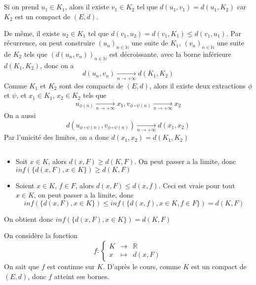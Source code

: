 \documentclass[a4paper,12pt]{book}
\begin{document}
\subsection{}
Si on prend $u_1 \in K_1$, alors il existe $v_1 \in K_2$ tel que $d(u_1,v_1)=d(u_1,K_2)$ car $K_2$ est un compact de  $(E,d)$. 

De même, il existe $u_2\in K_1$ tel que $d(v_1,u_2)=d(v_1,K_1) \leq d(v_1,u_1)$. Par récurrence, on peut construire $(u_n)_{n \in \mathbb{N}}$ une suite de $K_1$, 
$(v_n)_{n \in \mathbb{N}}$ une suite de $K_2$ tels que $(d(u_n,v_n))_{n \in \mathbb{N}}$ est décroissante, avec la borne inférieure $d(K_1,K_2)$, donc on a 
$$
d(u_n,v_n)\xrightarrow[n \to +\infty]{}d(K_1,K_2)
$$ 
Comme $K_1$ et $K_2$ sont des compacts de $(E,d)$, alors il existe deux extractions $\phi$ et $\psi$, et $x_1 \in K_1$, $x_2 \in K_2$ tels que
 $$
 u_{\phi(n)} \xrightarrow[n \to +\infty]{}x_1, v_{\phi \circ \psi(n)} \xrightarrow[n \to +\infty]{}x_2
 $$
On a aussi 
$$
d(u_{\phi \circ \psi(n)},v_{\phi \circ \psi(n)} ) \xrightarrow[n \to +\infty]{} d(x_1,x_2)
$$
Par l'unicité des limites, on a donc $\boxed{d(x_1,x_2)=d(K_1,K_2)}$
\subsection{}
\begin{itemize}
    \item Soit $x \in K$, alors $d(x,F)\geq d(K,F)$. On peut passer a la limite, donc $inf(\{d(x,F),x \in K\}) \geq d(K,F)$
    \item Soient $x \in K$, $f \in F$, alors $d(x,F) \leq d(x,f)$. Ceci est vraie pour tout $x \in K$, on peut passer a la limite, donc 
    $$
    inf(\{d(x,F),x \in K\})\leq inf(\{d(x,f),x \in K,f \in F\})=d(K,F)
    $$
\end{itemize}
On obtient donc $inf(\{d(x,F),x \in K\})=d(K,F)$

On considère la fonction 
\begin{equation}  \nonumber
    f:\left\{  
                 \begin{array}{rcl}  
                  K  & \to & \mathbb{R}\\
                  x  & \mapsto& d(x,F)
                 \end{array}  
    \right.  
\end{equation}
On sait que $f$ est continue sur $K$. D'après le cours, comme $K$ est un compact de $(E,d)$, donc $f$ atteint ses bornes. 
\end{document}
